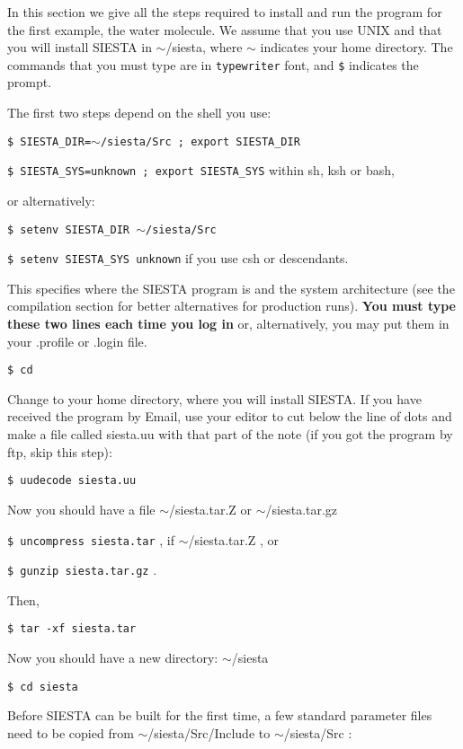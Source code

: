 \noindent
In this section we give all the steps required to install
and run the program for the first example, the water molecule.
We assume that you use UNIX and that you will install SIESTA in 
$\sim$/siesta, where $\sim$ indicates your home directory.
The commands that you must type are in {\tt typewriter} font, 
and {\tt \$} indicates the prompt.

The first two steps depend on the shell you use:

{\tt \$ SIESTA\_DIR=$\sim$/siesta/Src ; 
export SIESTA\_DIR}

{\tt \$ SIESTA\_SYS=unknown ; 
      export SIESTA\_SYS}
\hspace{1cm} within sh, ksh or bash,

\noindent
or alternatively: 

\vspace{1pt}
{\tt \$ setenv SIESTA\_DIR $\sim$/siesta/Src}

{\tt \$ setenv SIESTA\_SYS unknown}
\hspace{2.5cm} if you use csh or descendants.

\noindent
This specifies where the SIESTA program is and  
the system architecture (see the compilation section for
better alternatives for production runs). {\bf You must type these two lines
each time you log in} or, alternatively, you may put them
in your .profile or .login file.

{\tt \$ cd}

\noindent
Change to your home directory, where you will install SIESTA.
If you have received the program by Email, use your editor to
cut below the line of dots and make a file called siesta.uu
with that part of the note (if you got the program by ftp,
skip this step):

{\tt \$ uudecode siesta.uu}

\noindent
Now you should have a file $\sim$/siesta.tar.Z or $\sim$/siesta.tar.gz

{\tt \$ uncompress siesta.tar} , if $\sim$/siesta.tar.Z , or

{\tt \$ gunzip siesta.tar.gz} . 

\noindent
Then,

{\tt \$ tar -xf siesta.tar}

\noindent
Now you should have a new directory: $\sim$/siesta

{\tt \$ cd siesta}

Before SIESTA can be built for the first time, a few 
standard parameter files need to be copied 
from $\sim$/siesta/Src/Include to $\sim$/siesta/Src :

